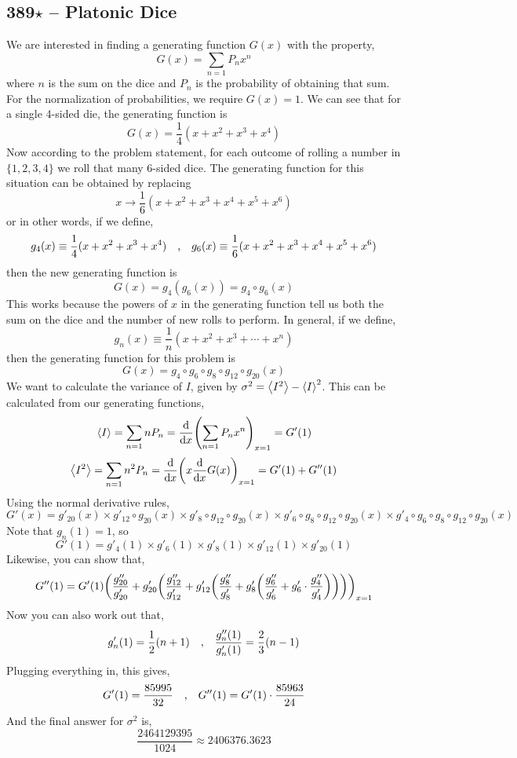 \documentclass{article}
\begin{document}
\subsection*{389$\star$ -- Platonic Dice}
We are interested in finding a generating function $G(x)$ with the property,
\[ G(x) = \sum_{n=1} P_n x^n \]
where $n$ is the sum on the dice and $P_n$ is the probability of obtaining that sum.
For the normalization of probabilities, we require $G(x) = 1$.
We can see that for a single 4-sided die, the generating function is
\[ G(x) = \frac{1}{4}(x + x^2 + x^3 + x^4) \]
Now according to the problem statement, for each outcome of rolling a number in $\{1,2,3,4\}$ we roll that many 6-sided dice.
The generating function for this situation can be obtained by replacing
\[ x \to \frac{1}{6}(x+x^2+x^3+x^4+x^5+x^6) \]
or in other words, if we define,
\[ g_4(x) \equiv \frac{1}{4}(x+x^2+x^3+x^4) \qq{,} g_6(x) \equiv \frac{1}{6}(x+x^2+x^3+x^4+x^5+x^6)\]
then the new generating function is
\[ G(x) = g_4 (g_6(x)) = g_4 \circ g_6(x) \]
This works because the powers of $x$ in the generating function tell us both the sum on the dice and the number of new rolls to perform.
In general, if we define,
\[ g_n(x) \equiv \frac{1}{n}(x+x^2 + x^3 + \cdots + x^n) \]
then the generating function for this problem is
\[ G(x) = g_4 \circ g_6 \circ g_8 \circ g_{12} \circ g_{20} (x) \]
We want to calculate the variance of $I$, given by $\sigma^2 = \ev{I^2} - \ev{I}^2$.
This can be calculated from our generating functions,
\[ \ev{I} = \sum_{n=1} n P_n = \dv{x} \qty( \sum_{n=1} P_n x^n)_{x=1} = G'(1) \]
\[ \ev{I^2} = \sum_{n=1} n^2 P_n = \dv{x} \qty( x \dv{x} G(x) )_{x=1} = G'(1) + G''(1) \]
Using the normal derivative rules,
\[ G'(x) = g'_{20}(x) \times g'_{12} \circ g_{20}(x) \times g'_8 \circ g_{12} \circ g_{20}(x) \times g'_6 \circ g_8 \circ g_{12} \circ g_{20}(x) \times g'_4 \circ g_6 \circ g_8 \circ g_{12} \circ g_{20}(x)\]
Note that $g_n(1) = 1$, so
\[ G'(1) = g'_4(1) \times g'_6(1) \times g'_8(1) \times g'_{12}(1) \times g'_{20}(1) \]
Likewise, you can show that,
\[  G''(1) = G'(1)\qty( \frac{g''_{20}}{g'_{20}} + g'_{20} \qty(\frac{g''_{12}}{g'_{12}} + g'_{12} \qty(\frac{g''_8}{g'_8} + g'_8 \qty(\frac{g''_6}{g'_6} + g'_6 \cdot \frac{g''_4}{g'_4}))))_{x=1}  \]
Now you can also work out that,
\[ g'_n(1) = \frac{1}{2}(n+1) \qq{,} \frac{g''_n(1)}{g'_n(1)} = \frac{2}{3}(n-1) \]
Plugging everything in, this gives,
\[ G'(1) = \frac{85995}{32} \qq{,} G''(1) = G'(1) \cdot \frac{85963}{24} \]
And the final answer for $\sigma^2$ is,
\[ \frac{2464129395}{1024} \approx \boxed{ 2406376.3623} \]
\end{document}
